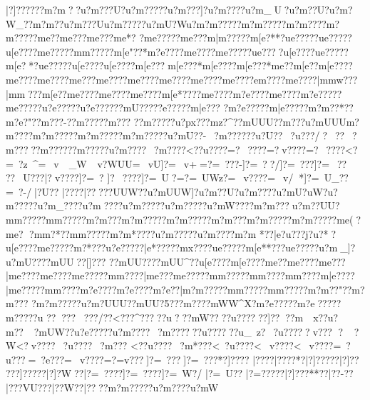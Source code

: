 {{{{{{{{{{{{{{{{{{{{{{{{{{{{{{{{{{{{{{{{{{{{{{{{{{{{{{{{{{{{{{{{{{{{{{{{{{{{{{{{{{{{{{{{{{{{{{{{{{{{{{{{{{{{{{{{{{{{{{{{{{{{{{{{{{{{{{{{{{{{{{{{{{{{{{{{{{{{{{{{{{{{{{{{{{{{{{{{{{{{{{{{{{{{{{{{{{{{{{{{{{{{{{{{{{{{{{{{{{{{{{{{{{{{{{{{{{{{{{{{{{{{{{{{{{{{{{{{{{{{{{{{{{{{{{{{{{{{{{{{{{{{{{{{{{{{{{{{{{{{{{{{{{{{{{{{{{{{{{{{{{{{{{{{{{{{{{{{{{{{{{{{{{{{{{{{{{{{{{{{{{{{{{{{{{{{{{{{{{{{{{{{{{{{{{{{{{{{{{{{{{{{{{{{{{{{{{{{{{{{{{{{{{{{{{{{{{{{{{{{{{{{{{{{{{{{{{{{{{{{{{{{{{{{{{{{{{{{{{{{{{{{{{{{{{{{{{{{{{{{{{{{{{{{{{{{{{{{{{{{{{{{{{{{{{{{{{{{{{{{{{{{{{{{{{{{{{{{{{{{{{{{{{{{{{{{{{{{{{{{{{{{{{{{{{{{{{{{{{{{{{{{{{{{{{{{{{{{{{{{{{{{{{{{{{{{{{{{{{{{ |?]??????m?m ??u?m???U?u?m?????u?m???]?u?m????u?m_U?u?m??}U?u?m?W_??m?m??{u?m???U{u?m?????u?mU?Wu?m?m?????m?m?????m?m????m?m?????m{e?   ?m{e??  ?m{e??  ?m{e*?
 ?m{e?????m{e???{m|m?????m[e?**?u{e?????u{e?????u[e????{m{e?????m{m?????m[e"??*{m?e????{m{e????{m{e?????u{e????u[e??? ?u{e?????m[e? *?u{e?????u[e????u[e????{m[e???{m[e???*{m[e????{m[e???*{m{e??{m[e??{m[e????{m{e????{m{e????{m{e???{m{e????{m{e????{m{e????{m{e????{m{e????{e{m????{m{e????|m{mw???|m{m???{m[e??{m{e????{m{e????{m{e????{m[e*????m{e????{m?e????{m{e????{m?e?????m{e?????u?e?????u?e?????}?mU????}?e?????m|e???
?m?e?????m|e?????m?m??*??m?e?"  ?}?m???-?}?m????}?m???
?}?m??? ?}?u?px??}?mz?{^?}?mUUU??m?}   ??u?mUUU\?m?m}????m?m?????m?m?????m?m?????u?mU??-~?m?????}?u?U??~?u???/?~??~?m??? ??m?????}?m?????u?m????~?m????<??u????=?~????=?v????=?~????<?=~?z~^=~v~~_W~v?WUU=~vU]?=~v+  =?=~???-]?=~??/]?=~??? ]?=~??
??~U???|?v????]?=~?
 ]?~????]?=~U?=?=~UWz?=~v????=~v/*]?=~U_??\?=~?-/|?\?U??
|?\???? |?\??? ??\?UUW??u?mUUW]?u?m??U?u?m????u?mU?uW?u?m?????u?m_????u?m????u?m?????u?m?????u?mW????m?m???{u?m??UU?m{m?????m{m?????m?m???m?m?????m?m?????m?m???m?m?????m?m?????m{e(  ?m{e?
 ?m{m?*? ?m{m?????m?m*????u?m?????u?m????{m?m
*??|e?u???j?u\e?* ?u[e??? ?m{e?????m\e?*???u?e?????}|e*????}?mx????u{e?????m[e**???u{e?????u?m_]?u?mU????}{mUU??[]???
??mUU? ???mUU^??u[e????{m[e????{m{e??{m{e????{m{e???|m{e????{m{e????{m{e?????m{m????|m{e???m{e?????m{m?????m{m????m{m????{m|e????|m{e?????m{m????{m?e????{m?e????{m?e??|m?m?????m{m?????m{m?????m?m??"??m?m???
?m?m?????u?m?UUU?}?mUU?5???m?? ?}?mWW^X?m?e?????m?e????}?m????}?u	????}???}?/??<???^?????u^^^???mW?? ??u??????}]????m~~x??u?m?? ~?mUW{??u?e?????u?m????~?m??????u??????u_~z?~?u?????v???
?~ 
?W<?v????~?u????~?m???
<??u????~?m*???<~?u????<~v????<~v????=~?u???=~?e??? =~v????=?=v???]?=~???]?=~???*}?]????
|?}???|?}???*?|?]?????|?]?? 
???]?????|?]?W??|?=~????]?=~????]?=~W?/
|?=~U??
|?=?????|?]???**??|??-??|???VU? ??|?  ?W??|?? ??m?m?????u?m????u?mW{
}}}}}}}}}}}}}}}}}}}}}}}}}}}}}}}}}}}}}}}}}}}}}}}}}}}}}}}}}}}}}}}}}}}}}}}}}}}}}}}}}}}}}}}}}}}}}}}}}}}}}}}}}}}}}}}}}}}}}}}}}}}}}}}}}}}}}}}}}}}}}}}}}}}}}}}}}}}}}}}}}}}}}}}}}}}}}}}}}}}}}}}}}}}}}}}}}}}}}}}}}}}}}}}}}}}}}}}}}}}}}}}}}}}}}}}}}}}}}}}}}}}}}}}}}}}}}}}}}}}}}}}}}}}}}}}}}}}}}}}}}}}}}}}}}}}}}}}}}}}}}}}}}}}}}}}}}}}}}}}}}}}}}}}}}}}}}}}}}}}}}}}}}}}}}}}}}}}}}}}}}}}}}}}}}}}}}}}}}}}}}}}}}}}}}}}}}}}}}}}}}}}}}}}}}}}}}}}}}}}}}}}}}}}}}}}}}}}}}}}}}}}}}}}}}}}}}}}}}}}}}}}}}}}}}}}}}}}}}}}}}}}}}}}}}}}}}}}}}}}}}}}}}}}}}}}}}}}}}}}}}}}}}}}}}}}}}}}}}}}}}}}}}}}}}}}}}}}}}}}}}}}}}}}}}}}}}}}}}}}}}}}}}}}}}}}}}}}}}}}}}}}}}}}}}}}}}}}}}}}}}}}}}}}}}}}}}}}}}}}}}}}}}}}}}}}}}}}}}}}}}}}}}}}}}}}}}}}}}}}}}}}}}}}}}}}}}}}}}}}}}}}}}}}}}}}}}}}}}}}}
